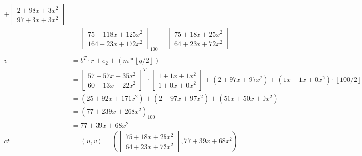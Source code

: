 \begin{align*}
  +
  \begin{bmatrix}2+98x+3x^2 \\ 97+3x+3x^2 \end{bmatrix}                                                 \\
          & = \begin{bmatrix}75+118x+125x^2 \\ 164+23x+172x^2 \end{bmatrix}_{100}
  = 
  \begin{bmatrix}75+18x+25x^2 \\ 64+23x+72x^2 \end{bmatrix}                                             \\
  \\
  v       & = b^T \cdot r + e_2 + (m*\left\lfloor q/2\right\rfloor)                                     \\
          & =\begin{bmatrix}
               57+57x+35x^2 \\
               60+13x+22x^2
             \end{bmatrix} ^T
  \cdot
  \begin{bmatrix}1+1x+1x^2 \\ 1+0x+0x^2 \end{bmatrix}
  + (2+97x+97x^2) + (1x+1x+0x^2) \cdot \left\lfloor 100/2\right\rfloor                                  \\
          & = (25+92x+171x^2) + (2+97x+97x^2) + (50x+50x+0x^2)                                          \\
          & = (77+239x+268x^2)_{100}                                                                    \\
          & = 77+39x+68x^2                                                                              \\
  ct & = (u, v) = \left (
  \begin{bmatrix}75+18x+25x^2 \\ 64+23x+72x^2 \end{bmatrix}, 77+39x+68x^2   \right )                    \\
\end{align*}

